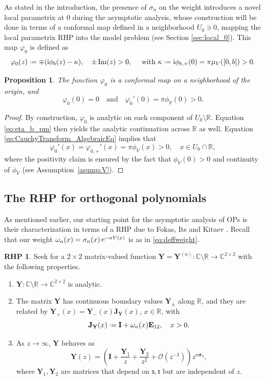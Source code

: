 \documentclass[reqno,a4paper,11pt]{amsart}
\DeclareMathOperator{\ee}{\rm e}
\renewcommand{\Im}{\mathop{\rm Im}}
\newcommand{\C}{\mathbb{C}}
\newcommand{\R}{\mathbb{R}}
\newcommand{\Boh}{\mathcal{O}}
\newcommand{\ii}{\mathrm{i}}
\newcommand*{\deff}{\mathrel{\vcenter{\baselineskip0.5ex \lineskiplimit0pt
                     \hbox{\scriptsize.}\hbox{\scriptsize.}}}%
                     =}
\renewcommand{\bm}{\mathbf}
\newcommand{\msf}{\mathsf}
\renewcommand{\sp}{\boldsymbol \sigma}
\newcommand{\tad}{\msf t}
\newcommand{\sad}{\msf s}
\newtheorem{prop}[theorem]{Proposition}
\theoremstyle{definition}
\newtheorem{rhp}[theorem]{RHP}
\theoremstyle{remark}
\numberwithin{equation}{section}
\newcommand*{\defeq}{\mathrel{\vcenter{\baselineskip0.5ex \lineskiplimit0pt
                     \hbox{\scriptsize.}\hbox{\scriptsize.}}}%
                     =}
\begin{document}
    As stated in the introduction, the presence of $\sigma_n$ on the weight introduces a novel local parametrix at $0$ during the asymptotic analysis, whose construction will be done in terms of a conformal map defined in a neighborhood $U_0 \ni 0$, mapping the local parametrix RHP into the model problem (see Section \ref{sec:local_0}). This map $\varphi_0$ is defined as 
    \begin{equation}\label{deff:conformalphi}
        \varphi_0(z) \defeq \mp (\ii \phi_b(z) - \kappa), \quad \pm \Im(z) > 0, \quad \text{ with } \kappa \defeq \ii \phi_{b,+}(0) = \pi \mu_V([0,b]) > 0.
    \end{equation}

    \begin{prop}\label{prop:properties_of_varphi_0}
    The function $\varphi_0$ is a conformal map on a neighborhood of the origin, and
    $$
    \varphi_0(0)=0\quad \text{and}\quad \varphi_0'(0)=\pi\phi_V(0)>0.
    $$
\end{prop}
\begin{proof}
    By construction, $\varphi_0$ is analytic on each component of $U_0\setminus \R$. Equation \eqref{eq:eta_b_pm} then yields the analytic continuation across $\R$ as well. Equation \eqref{eq:CauchyTransform_AlgebraicEq} implies that
    \[
        \varphi_0'(x) = \varphi_{0,+}'(x) = \pi \phi_V(x) >0, \quad x \in U_0 \cap \R,
    \]
    where the positivity claim is ensured by the fact that $\phi_V(0)>0$ and continuity of $\phi_V$ (see Assumption~\ref{asump:V}).
\end{proof}
    
\subsection{The RHP for orthogonal polynomials}\hfill

As mentioned earlier, our starting point for the asymptotic analysis of OPs is their characterization in terms of a RHP due to Fokas, Its and Kitaev \cite{Fokas1992}. Recall that our weight $\omega_n(x)=\sigma_n(x)\ee^{-nV(x)}$ is as in \eqref{eq:deffweight}.
%
\begin{rhp} \label{rhp:Y}
Seek for a $2\times 2$ matrix-valued function $\bm Y = \bm Y^{(n)}:\C\setminus \R\to \C^{2\times 2}$ with the following properties.
\begin{enumerate}[\rm (i)]
\item $\bm Y:\C\setminus \R\to \C^{2\times 2}$ is analytic.
\item The matrix $\bm Y$ has continuous boundary values $\bm Y_\pm$ along $\R$, and they are related by $\bm Y_+(x)=\bm Y_-(x)\bm J_{\bm Y}(x)$, $x\in \R$, with
%
$$
\bm J_{\bm Y}(x)\deff \bm I+\omega_n(x)\bm E_{12},\quad x>0.
$$
%
\item As $z\to \infty$, $\bm Y$ behaves as
%
$$
\bm Y(z)=\left(\bm I+\frac{\bm Y_1}{z} + 
\frac{\bm Y_2}{z^2} + \Boh(z^{-3})\right)z^{n\sp_3},
$$
%
where $\bm Y_1,\bm Y_2$ are matrices that depend on $\sad,\tad$ but are independent of $z$.
\end{enumerate}
\end{rhp}
\end{document}
